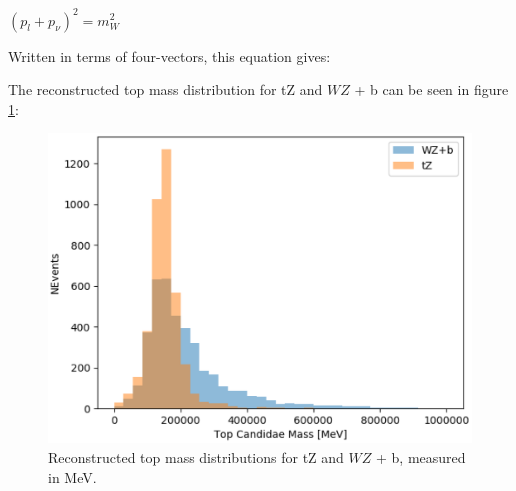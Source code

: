 \documentclass[NOTE, atlasdraft=true, texlive=2016, UKenglish]{\ATLASLATEXPATH atlasdoc}
\begin{document}
\begin{center}
   $(p_l + p_{\nu})^2 = m_W^2$ \\ 
\end{center} 

Written in terms of four-vectors, this equation gives:

The reconstructed top mass distribution for tZ and $WZ$ + b can be seen in figure \ref{fig:topMass}:

\begin{figure}[H]
    \centering
    \includegraphics[width=0.7\linewidth]{tZ_bdt/topMass.eps}
    \caption{Reconstructed top mass distributions for tZ and $WZ$ + b, measured in MeV.}
    \label{fig:topMass}
\end{figure}


\fi

\clearpage
\printbibliography
\end{document}
